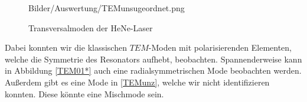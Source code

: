 \begin{figure}[ht]
{      {Bilder/Auswertung/TEMunsugeordnet.png}}
      \caption{Transversalmoden der HeNe-Laser}
      \label{bild:Moden}
  \end{figure}

  Dabei konnten wir die klassischen $TEM$-Moden mit polarisierenden Elementen, welche die Symmetrie des Resonators aufhebt, beobachten.
  Spannenderweise kann in Abbildung \ref{TEM01*} auch eine radialsymmetrischen Mode beobachten werden. Außerdem
  gibt es eine Mode in \ref{TEMunz}, welche wir nicht identifizieren konnten. Diese könnte eine Mischmode sein.
\clearpage